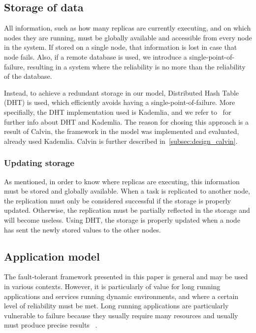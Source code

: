 \documentclass{cslthse-msc}
\begin{document}
\subsection{Storage of data} \label{subsec:design_storage}
All information, such as how many replicas are currently executing, and on which nodes they are running, must be globally available and accessible from every node in the system. If stored on a single node, that information is lost in case that node fails. Also, if a remote database is used, we introduce a single-point-of-failure, resulting in a system where the reliability is no more than the reliability of the database. 

Instead, to achieve a redundant storage in our model, Distributed Hash Table (DHT) is used, which efficiently avoids having a single-point-of-failure. More specifially, the DHT implementation used is Kademlia, and we refer to~\cite{kademlia} for further info about DHT and Kademlia. The reason for chosing this approach is a result of Calvin, the framework in the model was implemented and evaluated, already used Kademlia. Calvin is further described in~\cref{subsec:design_calvin}.

\subsubsection{Updating storage}
As mentioned, in order to know where replicas are executing, this information must be stored and globally available. When a task is replicated to another node, the replication must only be considered successful if the storage is properly updated. Otherwise, the replication must be partially reflected in the storage and will become useless. Using DHT, the storage is properly updated when a node has sent the newly stored values to the other nodes. 

\subsection{Application model} \label{subsec:design_app_model}
The fault-tolerant framework presented in this paper is general and may be used in various contexts. However, it is particularly of value for long running applications and services running dynamic environments, and where a certain level of reliability must be met. Long running applications are particularly vulnerable to failure because they usually require many resources and usually must produce precise results ~\cite{relGridSystems}.
\end{document}
